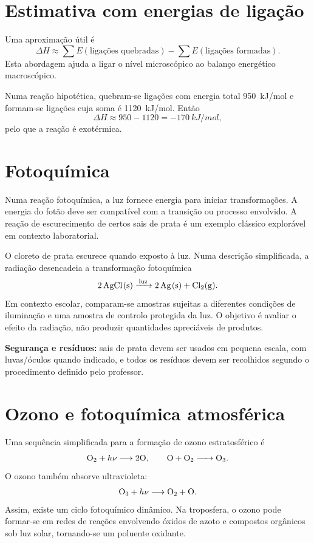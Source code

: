 \documentclass[11pt,a4paper,oneside]{book}
\begin{document}
\section{Estimativa com energias de ligação}
Uma aproximação útil é
\[
\Delta H\approx\sum E(\text{ligações quebradas})-\sum E(\text{ligações formadas}).
\]
Esta abordagem ajuda a ligar o nível microscópico ao balanço energético macroscópico.

\begin{exemplo}[title=Exemplo resolvido -- energias de ligação]
Numa reação hipotética, quebram-se ligações com energia total \SI{950}{kJ/mol} e formam-se ligações cuja soma é \SI{1120}{kJ/mol}. Então
\[
\Delta H\approx950-1120=-\SI{170}{kJ/mol},
\]
pelo que a reação é exotérmica.
\end{exemplo}

\section{Fotoquímica}
Numa reação fotoquímica, a luz fornece energia para iniciar transformações. A energia do fotão deve ser compatível com a transição ou processo envolvido. A reação de escurecimento de certos sais de prata é um exemplo clássico explorável em contexto laboratorial.

\begin{atividade}[title=AL 2.4 -- Reação fotoquímica do cloreto de prata]
O cloreto de prata escurece quando exposto à luz. Numa descrição simplificada, a radiação desencadeia a transformação fotoquímica
\[
\ce{2AgCl(s) ->[luz] 2Ag(s) + Cl2(g)}.
\]
Em contexto escolar, comparam-se amostras sujeitas a diferentes condições de iluminação e uma amostra de controlo protegida da luz. O objetivo é avaliar o efeito da radiação, não produzir quantidades apreciáveis de produtos.

\textbf{Segurança e resíduos:} sais de prata devem ser usados em pequena escala, com luvas/óculos quando indicado, e todos os resíduos devem ser recolhidos segundo o procedimento definido pelo professor.
\end{atividade}

\section{Ozono e fotoquímica atmosférica}
Uma sequência simplificada para a formação de ozono estratosférico é
\[
\ce{O2} + h\nu \longrightarrow 2\ce{O},
\qquad
\ce{O + O2 -> O3}.
\]
O ozono também absorve ultravioleta:
\[
\ce{O3} + h\nu \longrightarrow \ce{O2 + O}.
\]
Assim, existe um ciclo fotoquímico dinâmico. Na troposfera, o ozono pode formar-se em redes de reações envolvendo óxidos de azoto e compostos orgânicos sob luz solar, tornando-se um poluente oxidante.
\end{document}

